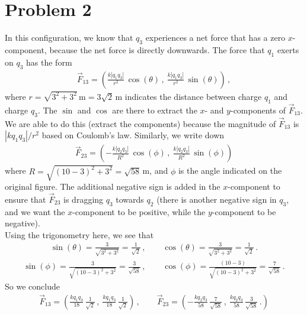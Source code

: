 \documentclass[11pt]{article}
\begin{document}
\section*{Problem 2}
In this configuration, we know that $q_3$ experiences a net force that has a zero $x$-component, because the net force is directly downwards. The force that $q_1$ exerts on $q_3$ has the form
\begin{align*}
\vec{F}_{13} = \left(
\frac{k|q_1q_3|}{r^2}\, \cos(\theta)\,,\
\frac{k|q_1q_3|}{r^2}\, \sin(\theta)
\right)\,,
\end{align*}
where $r = \sqrt{3^2 + 3^2}\,\text{m}= 3\sqrt{2}$\,m indicates the distance between charge $q_1$ and charge $q_3$. The $\sin$ and $\cos$ are there to extract the $x$- and $y$-components of $\vec{F}_{13}$. We are able to do this (extract the components) because the magnitude of $\vec{F}_{13}$ is $|kq_1q_3|/r^2$ based on Coulomb's law. Similarly, we write down
\begin{align*}
\vec{F}_{23} = \left(-
\frac{k|q_2q_3|}{R^2}\, \cos(\phi)\,,\
\frac{k|q_2q_3|}{R^2}\, \sin(\phi)
\right)
\end{align*}
where $R = \sqrt{(10-3)^2 + 3^2} = \sqrt{58}\,$m, and $\phi$ is the angle indicated on the original figure. The additional negative sign is added in the $x$-component to ensure that $\vec{F}_{23}$ is dragging $q_3$ towards $q_2$ (there is another negative sign in $q_3$, and we want the $x$-component to be positive, while the $y$-component to be negative). \\

Using the trigonometry here, we see that 
\begin{align*}
\sin(\theta) = \frac{3}{\sqrt{3^2 + 3^2}} = \frac{1}{\sqrt{2}}\,,\qquad
\cos(\theta) = \frac{3}{\sqrt{3^2 + 3^2}} = \frac{1}{\sqrt{2}}\,.
\end{align*}
\begin{align*}
\sin(\phi) = \frac{3}{\sqrt{(10-3)^2 + 3^2}} = \frac{3}{\sqrt{58}}\,,\qquad
\cos(\phi) = \frac{(10-3)}{\sqrt{(10-3)^2 + 3^2}} = \frac{7}{\sqrt{58}}\,.
\end{align*}
So we conclude 
\begin{align*}
\vec{F}_{13} = \left(
\frac{kq_1q_3}{18}\,\frac{1}{\sqrt{2}} \,,\
\frac{kq_1q_3}{18}\,\frac{1}{\sqrt{2}}
\right)\,,\qquad
\vec{F}_{23} = \left(-
\frac{kq_2q_3}{58}\,\frac{7}{\sqrt{58}} \,,\
\frac{kq_2q_3}{58}\,\frac{3}{\sqrt{58}} \,.
\right)\\
\end{align*}
\end{document}
